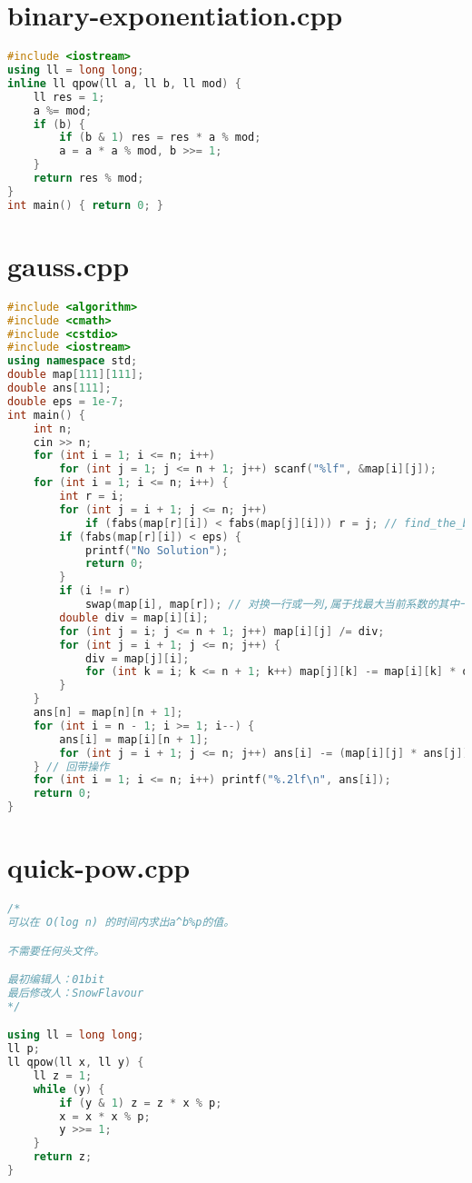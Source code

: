 \documentclass[9pt, a4paper, oneside]{book}
\begin{document}
\section{binary-exponentiation.cpp}
\begin{lstlisting}[language={C++}]
#include <iostream>
using ll = long long;
inline ll qpow(ll a, ll b, ll mod) {
    ll res = 1;
    a %= mod;
    if (b) {
        if (b & 1) res = res * a % mod;
        a = a * a % mod, b >>= 1;
    }
    return res % mod;
}
int main() { return 0; }\end{lstlisting}
\section{gauss.cpp}
\begin{lstlisting}[language={C++}]
#include <algorithm>
#include <cmath>
#include <cstdio>
#include <iostream>
using namespace std;
double map[111][111];
double ans[111];
double eps = 1e-7;
int main() {
    int n;
    cin >> n;
    for (int i = 1; i <= n; i++)
        for (int j = 1; j <= n + 1; j++) scanf("%lf", &map[i][j]);
    for (int i = 1; i <= n; i++) {
        int r = i;
        for (int j = i + 1; j <= n; j++)
            if (fabs(map[r][i]) < fabs(map[j][i])) r = j; // find_the_biggest_number_of_the_first_column（at present)
        if (fabs(map[r][i]) < eps) {
            printf("No Solution");
            return 0;
        }
        if (i != r)
            swap(map[i], map[r]); // 对换一行或一列,属于找最大当前系数的其中一步。（这样就可以只处理当前行的系数啦！）
        double div = map[i][i];
        for (int j = i; j <= n + 1; j++) map[i][j] /= div;
        for (int j = i + 1; j <= n; j++) {
            div = map[j][i];
            for (int k = i; k <= n + 1; k++) map[j][k] -= map[i][k] * div;
        }
    }
    ans[n] = map[n][n + 1];
    for (int i = n - 1; i >= 1; i--) {
        ans[i] = map[i][n + 1];
        for (int j = i + 1; j <= n; j++) ans[i] -= (map[i][j] * ans[j]);
    } // 回带操作
    for (int i = 1; i <= n; i++) printf("%.2lf\n", ans[i]);
    return 0;
}\end{lstlisting}
\section{quick-pow.cpp}
\begin{lstlisting}[language={C++}]
/*
可以在 O(log n) 的时间内求出a^b%p的值。

不需要任何头文件。

最初编辑人：01bit
最后修改人：SnowFlavour
*/

using ll = long long;
ll p;
ll qpow(ll x, ll y) {
    ll z = 1;
    while (y) {
        if (y & 1) z = z * x % p;
        x = x * x % p;
        y >>= 1;
    }
    return z;
}\end{lstlisting}
\end{document}
